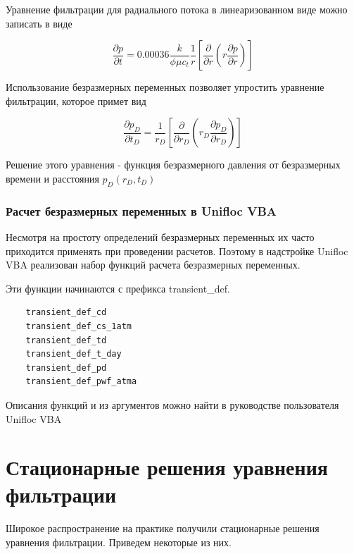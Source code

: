 \documentclass[
  russian,
  letterpaper,
  DIV=11,
  numbers=noendperiod,
  oneside]{scrartcl}
\begin{document}
Уравнение фильтрации для радиального потока в линеаризованном виде можно
записать в виде

\[ 
\frac{\partial p}{\partial t} = 0.00036 \dfrac{k}{\phi \mu c_t} \dfrac{1}{r} \left[ \dfrac{\partial}{\partial r} \left( r \dfrac{ \partial p} {\partial r} \right) \right]  
\]

Использование безразмерных переменных позволяет упростить уравнение
фильтрации, которое примет вид

\[ 
\frac{\partial p_D}{ \partial t_D} = \dfrac{1}{r_D} \left[ \dfrac{\partial}{\partial r_D} \left( r_D \dfrac{ \partial p_D} {\partial r_D} \right) \right] 
\]

Решение этого уравнения - функция безразмерного давления от безразмерных
времени и расстояния \(p_D(r_D, t_D)\)

\subsubsection{Расчет безразмерных переменных в Unifloc
VBA}\label{ux440ux430ux441ux447ux435ux442-ux431ux435ux437ux440ux430ux437ux43cux435ux440ux43dux44bux445-ux43fux435ux440ux435ux43cux435ux43dux43dux44bux445-ux432-unifloc-vba}

Несмотря на простоту определений безразмерных переменных их часто
приходится применять при проведении расчетов. Поэтому в надстройке
Unifloc VBA реализован набор функций расчета безразмерных переменных.

Эти функции начинаются с префикса transient\_def.

\begin{verbatim}
    transient_def_cd
    transient_def_cs_1atm
    transient_def_td
    transient_def_t_day
    transient_def_pd
    transient_def_pwf_atma
\end{verbatim}

Описания функций и из аргументов можно найти в руководстве пользователя
Unifloc VBA

\section{Стационарные решения уравнения
фильтрации}\label{ux441ux442ux430ux446ux438ux43eux43dux430ux440ux43dux44bux435-ux440ux435ux448ux435ux43dux438ux44f-ux443ux440ux430ux432ux43dux435ux43dux438ux44f-ux444ux438ux43bux44cux442ux440ux430ux446ux438ux438}

Широкое распространение на практике получили стационарные решения
уравнения фильтрации. Приведем некоторые из них.
\end{document}
